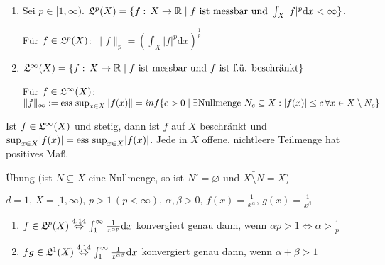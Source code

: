 \documentclass[a4paper,twoside,DIV15,BCOR12mm,chapterprefix=true,headings=onelinechapter]{scrbook}
\begin{document}
\begin{definition}
\begin{enumerate}
\item Sei \(p\in[1,\infty)\). \(\mathfrak{L}^{p}(X)=\{f:\,X\to\mathbb{R}\mid f \text{ ist messbar und }\int_{X}{\lvert f\rvert^{p}\mathrm{d}x<\infty}\}\).

F\"ur \(f\in\mathfrak{L}^{p}(X)\): \(\lVert f\rVert_{p}=\left(\int_{X}{\lvert f\rvert^{p}\mathrm{d}x}\right)^{\frac{1}{p}}\)
\item \(\mathfrak{L}^{\infty}(X)=\{f:\,X\to\mathbb{R}\mid f\text{ ist messbar und }f\text{ ist f.\"u. beschr\"ankt}\}\)

F\"ur \(f\in\mathfrak{L}^{\infty}(X)\): \(\lVert f\rVert_{\infty}:=\text{ess sup}_{x\in X}\lVert f(x)\rVert=inf\{c>0\mid \exists\text{Nullmenge }N_{c}\subseteq X: \lvert f(x)\rvert\leq c\,\forall x\in X\setminus N_{c}\}\)
\end{enumerate}
\end{definition}

\begin{bemerkung}
Ist \(f\in\mathfrak{L}^{\infty}(X)\) und stetig, dann ist \(f\) auf \(X\) beschr\"ankt und \(\sup_{x\in X}\lvert f(x)\rvert=\text{ess sup}_{x\in X}\lvert f(x)\rvert\). Jede in \(X\) offene, nichtleere Teilmenge hat positives Ma\ss.
\end{bemerkung}
\begin{beweis}
\"Ubung (ist \(N\subseteq X\) eine Nullmenge, so ist \(N^{\circ}=\varnothing\) und \(\bar{X\setminus N}=X\))
\end{beweis}

\begin{beispiele}
\(d=1,\,X=[1,\infty),\,p>1\,(p<\infty),\,\alpha,\beta>0,\,f(x)=\frac{1}{x^{\alpha}},\,g(x)=\frac{1}{x^{\beta}}\)
\begin{enumerate}
\item \(f\in\mathfrak{L}^{p}(X)\overset{\text{4.14}}{\Leftrightarrow}\int_{1}^{\infty}{\frac{1}{x^{\alpha p}}\mathrm{d}x}\) 
konvergiert genau dann, wenn \(\alpha p>1\Leftrightarrow \alpha>\frac{1}{p}\)
\item \(fg\in\mathfrak{L}^{1}(X)\overset{\text{4.14}}{\Leftrightarrow}\int_{1}^{\infty}{\frac{1}{x^{\alpha\beta}}\mathrm{d}x}\)
konvergiert genau dann, wenn \(\alpha+\beta>1\)
\end{enumerate}
\end{beispiele}
\end{document}
